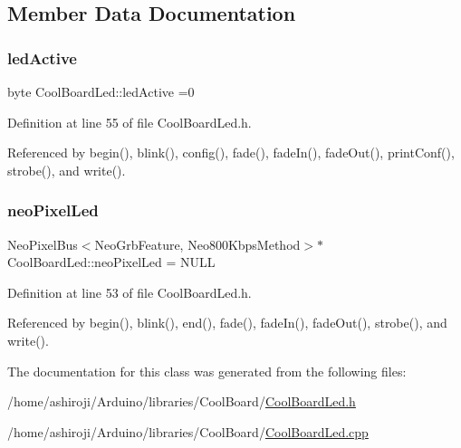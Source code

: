 \subsection{Member Data Documentation}
\mbox{\label{classCoolBoardLed_a5f17c135516fcf4b44ea8a096ba0177a}} 
\subsubsection{\texorpdfstring{led\+Active}{ledActive}}
{\footnotesize\ttfamily byte Cool\+Board\+Led\+::led\+Active =0\hspace{0.3cm}{\ttfamily [private]}}



Definition at line 55 of file Cool\+Board\+Led.\+h.



Referenced by begin(), blink(), config(), fade(), fade\+In(), fade\+Out(), print\+Conf(), strobe(), and write().

\mbox{\label{classCoolBoardLed_ac2c13fa462a010cd9242bf297c013923}} 
\subsubsection{\texorpdfstring{neo\+Pixel\+Led}{neoPixelLed}}
{\footnotesize\ttfamily Neo\+Pixel\+Bus$<$Neo\+Grb\+Feature, Neo800\+Kbps\+Method$>$$\ast$ Cool\+Board\+Led\+::neo\+Pixel\+Led = N\+U\+LL\hspace{0.3cm}{\ttfamily [private]}}



Definition at line 53 of file Cool\+Board\+Led.\+h.



Referenced by begin(), blink(), end(), fade(), fade\+In(), fade\+Out(), strobe(), and write().



The documentation for this class was generated from the following files\+:\begin{DoxyCompactItemize}
\item 
/home/ashiroji/\+Arduino/libraries/\+Cool\+Board/\hyperlink{CoolBoardLed_8h}{Cool\+Board\+Led.\+h}\item 
/home/ashiroji/\+Arduino/libraries/\+Cool\+Board/\hyperlink{CoolBoardLed_8cpp}{Cool\+Board\+Led.\+cpp}\end{DoxyCompactItemize}
